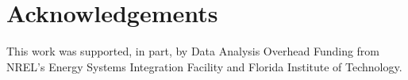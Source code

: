 \chapter*{Acknowledgements}
 This work was supported, in part, by Data Analysis Overhead Funding from NREL’s Energy Systems Integration Facility and Florida Institute of Technology.